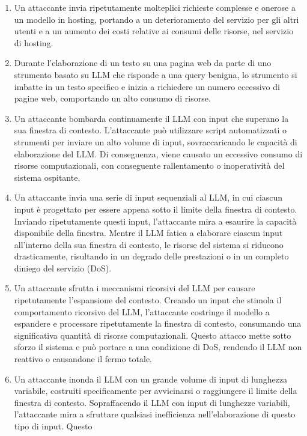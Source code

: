 \documentclass[
]{article}
\providecommand{\tightlist}{%
  \setlength{\itemsep}{0pt}\setlength{\parskip}{0pt}}
\begin{document}
\begin{enumerate}
\def\labelenumi{\arabic{enumi}.}
\tightlist
\item
  Un attaccante invia ripetutamente molteplici richieste complesse e
  onerose a un modello in hosting, portando a un deterioramento del
  servizio per gli altri utenti e a un aumento dei costi relative ai
  consumi delle risorse, nel servizio di hosting.
\item
  Durante l'elaborazione di un testo su una pagina web da parte di uno
  strumento basato su LLM che risponde a una query benigna, lo strumento
  si imbatte in un testo specifico e inizia a richiedere un numero
  eccessivo di pagine web, comportando un alto consumo di risorse.
\item
  Un attaccante bombarda continuamente il LLM con input che superano la
  sua finestra di contesto. L'attaccante può utilizzare script
  automatizzati o strumenti per inviare un alto volume di input,
  sovraccaricando le capacità di elaborazione del LLM. Di conseguenza,
  viene causato un eccessivo consumo di risorse computazionali, con
  conseguente rallentamento o inoperatività del sistema ospitante.
\item
  Un attaccante invia una serie di input sequenziali al LLM, in cui
  ciascun input è progettato per essere appena sotto il limite della
  finestra di contesto. Inviando ripetutamente questi input,
  l'attaccante mira a esaurire la capacità disponibile della finestra.
  Mentre il LLM fatica a elaborare ciascun input all'interno della sua
  finestra di contesto, le risorse del sistema si riducono
  drasticamente, risultando in un degrado delle prestazioni o in un
  completo diniego del servizio (DoS).
\item
  Un attaccante sfrutta i meccanismi ricorsivi del LLM per causare
  ripetutamente l'espansione del contesto. Creando un input che stimola
  il comportamento ricorsivo del LLM, l'attaccante costringe il modello
  a espandere e processare ripetutamente la finestra di contesto,
  consumando una significativa quantità di risorse computazionali.
  Questo attacco mette sotto sforzo il sistema e può portare a una
  condizione di DoS, rendendo il LLM non reattivo o causandone il fermo
  totale.
\item
  Un attaccante inonda il LLM con un grande volume di input di lunghezza
  variabile, costruiti specificamente per avvicinarsi o raggiungere il
  limite della finestra di contesto. Sopraffacendo il LLM con input di
  lunghezze variabili, l'attaccante mira a sfruttare qualsiasi
  inefficienza nell'elaborazione di questo tipo di input. Questo

\end{enumerate}
\end{document}
